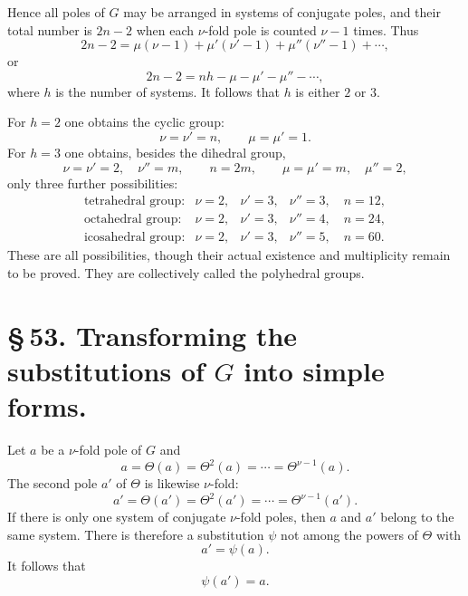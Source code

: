 \documentclass[11pt]{article}
\begin{document}
Hence all poles of $G$ may be arranged in systems of conjugate poles, and their total number is $2n-2$ when each $\nu$-fold pole is counted $\nu-1$ times. Thus
\begin{equation}
2n-2=\mu(\nu-1)+\mu'(\nu'-1)+\mu''(\nu''-1)+\cdots,
\tag{13}
\end{equation}
or
\begin{equation}
2n-2=nh-\mu-\mu'-\mu''-\cdots,
\tag{14}
\end{equation}
where $h$ is the number of systems. It follows that $h$ is either $2$ or $3$.

For $h=2$ one obtains the cyclic group:
\[
\nu=\nu'=n,
\qquad \mu=\mu'=1.
\]
For $h=3$ one obtains, besides the dihedral group,
\[
\nu=\nu'=2,\quad \nu''=m,
\qquad n=2m,
\qquad \mu=\mu'=m,
\quad \mu''=2,
\]
only three further possibilities:
\[
\begin{array}{llll}
\text{tetrahedral group:}&\nu=2,&\nu'=3,&\nu''=3,\quad n=12,\\
\text{octahedral group:}&\nu=2,&\nu'=3,&\nu''=4,\quad n=24,\\
\text{icosahedral group:}&\nu=2,&\nu'=3,&\nu''=5,\quad n=60.
\end{array}
\]
These are all possibilities, though their actual existence and multiplicity remain to be proved. They are collectively called the polyhedral groups.

\section*{\S\,53. Transforming the substitutions of $G$ into simple forms.}

Let $a$ be a $\nu$-fold pole of $G$ and
\begin{equation}
a=\Theta(a)=\Theta^2(a)=\cdots=\Theta^{\nu-1}(a).
\tag{1}
\end{equation}
The second pole $a'$ of $\Theta$ is likewise $\nu$-fold:
\begin{equation}
a'=\Theta(a')=\Theta^2(a')=\cdots=\Theta^{\nu-1}(a').
\tag{2}
\end{equation}
If there is only one system of conjugate $\nu$-fold poles, then $a$ and $a'$ belong to the same system. There is therefore a substitution $\psi$ not among the powers of $\Theta$ with
\begin{equation}
a'=\psi(a).
\tag{3}
\end{equation}
It follows that
\begin{equation}
\psi(a')=a.
\tag{4}
\end{equation}
\end{document}
